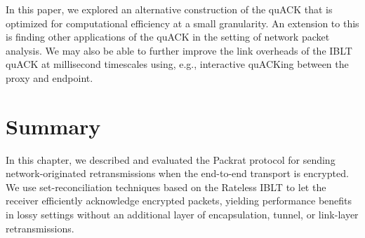 In this paper, we explored an alternative construction of the quACK that is
optimized for computational efficiency at a small granularity. An extension to
this is finding other applications of the quACK in the setting of network
packet analysis. We may also be able to further improve the link overheads of
the IBLT quACK at millisecond timescales using, e.g., interactive quACKing
between the proxy and endpoint.

\section{Summary}
\label{sec:packrat:summary}

In this chapter, we described and evaluated the Packrat protocol for sending
network-originated retransmissions when the end-to-end transport is encrypted.
We use set-reconciliation techniques based on the Rateless IBLT to let the
receiver efficiently acknowledge encrypted packets, yielding performance
benefits in lossy settings without an additional layer of encapsulation,
tunnel, or link-layer retransmissions.
